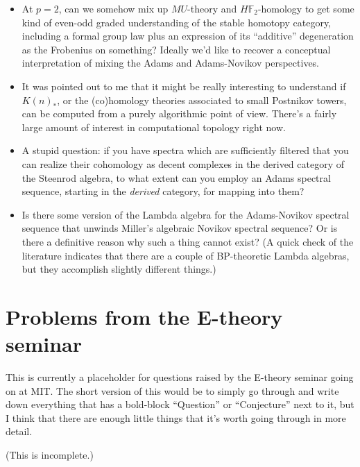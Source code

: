 \documentclass[12pt,titlepage]{article}
\theoremstyle{plain}
\theoremstyle{definition}
\theoremstyle{remark}
\begin{document}
\begin{itemize}%
\item At $p=2$, can we somehow mix up $MU$-theory and $H\mathbb{F}_2$-homology to get some kind of even-odd graded understanding of the stable homotopy category, including a formal group law plus an expression of its ``{}additive''{} degeneration as the Frobenius on something? Ideally we'{}d like to recover a conceptual interpretation of mixing the Adams and Adams-Novikov perspectives.


\item It was pointed out to me that it might be really interesting to understand if $K(n)_*$, or the (co)homology theories associated to small Postnikov towers, can be computed from a purely algorithmic point of view. There'{}s a fairly large amount of interest in computational topology right now.


\item A stupid question: if you have spectra which are sufficiently filtered that you can realize their cohomology as decent complexes in the derived category of the Steenrod algebra, to what extent can you employ an Adams spectral sequence, starting in the \emph{derived} category, for mapping into them?


\item Is there some version of the Lambda algebra for the Adams-Novikov spectral sequence that unwinds Miller'{}s algebraic Novikov spectral sequence? Or is there a definitive reason why such a thing cannot exist? (A quick check of the literature indicates that there are a couple of BP-theoretic Lambda algebras, but they accomplish slightly different things.)



\end{itemize}
\section{Problems from the E-theory seminar}

This is currently a placeholder for questions raised by the E-theory seminar going on at MIT. The short version of this would be to simply go through and write down everything that has a bold-block ``{}Question''{} or ``{}Conjecture''{} next to it, but I think that there are enough little things that it'{}s worth going through in more detail.

(This is incomplete.)
\end{document}
